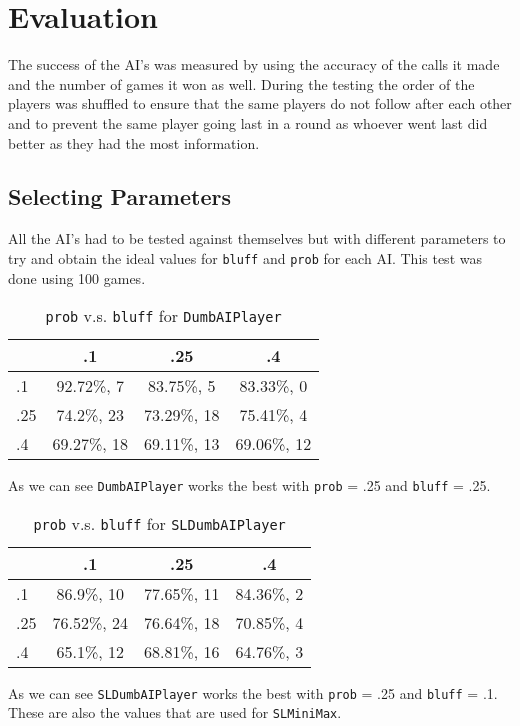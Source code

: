 \chapter{Evaluation}

The success of the AI's was measured by using the accuracy of the calls it made and the number of games it won as well. During the testing the order of the players was shuffled to ensure that the same players do not follow after each other and to prevent the same player going last in a round as whoever went last did better as they had the most information.

\section{Selecting Parameters}
All the AI's had to be tested against themselves but with different parameters to try and obtain the ideal values for \texttt{bluff} and \texttt{prob} for each AI. This test was done using 100 games.

\begin{table}
    \centering
    \begin{tabular}{l|ccc}
        &.1&.25&.4\\
        \hline
        .1&92.72\%, 7& 83.75\%, 5& 83.33\%, 0\\
        .25&74.2\%, 23& 73.29\%, 18& 75.41\%, 4\\
        .4&69.27\%, 18& 69.11\%, 13& 69.06\%, 12
    \end{tabular}
    \caption{\texttt{prob} v.s. \texttt{bluff} for \texttt{DumbAIPlayer}}
    \label{table:res1}
\end{table}

As we can see \texttt{DumbAIPlayer} works the best with \texttt{prob} = .25 and \texttt{bluff} = .25.

\begin{table}
    \centering
    \begin{tabular}{l|ccc}
        & .1& .25& .4\\
        \hline
        .1&86.9\%, 10& 77.65\%, 11& 84.36\%, 2\\
        .25&76.52\%, 24& 76.64\%, 18& 70.85\%, 4\\
        .4&65.1\%, 12& 68.81\%, 16& 64.76\%, 3
    \end{tabular}
    \caption{\texttt{prob} v.s. \texttt{bluff} for \texttt{SLDumbAIPlayer}}
    \label{table:res2}
\end{table}

As we can see \texttt{SLDumbAIPlayer} works the best with \texttt{prob} = .25 and \texttt{bluff} = .1. These are also the values that are used for \texttt{SLMiniMax}.

